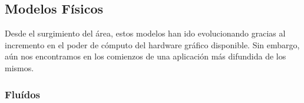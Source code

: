 



\subsection{Modelos Físicos}
Desde el surgimiento del área, estos modelos han ido evolucionando gracias al incremento en el poder de cómputo del hardware gráfico disponible. Sin embargo, aún nos encontramos en los comienzos de una aplicación más difundida de los mismos.
\subsubsection{Fluídos}
